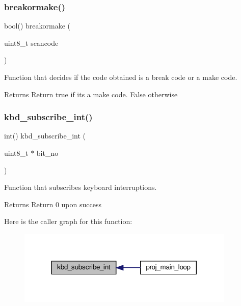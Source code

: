 \subsubsection{\texorpdfstring{breakormake()}{breakormake()}}
{\footnotesize\ttfamily bool() breakormake (\begin{DoxyParamCaption}\item[{uint8\+\_\+t}]{scancode }\end{DoxyParamCaption})}



Function that decides if the code obtained is a break code or a make code. 

\begin{DoxyReturn}{Returns}
Return true if it\textquotesingle{}s a make code. False otherwise 
\end{DoxyReturn}
\mbox{\label{group__keyboard_ga4ac9231a99a664d6a9f0b69767e0d707}} 
\subsubsection{\texorpdfstring{kbd\+\_\+subscribe\+\_\+int()}{kbd\_subscribe\_int()}}
{\footnotesize\ttfamily int() kbd\+\_\+subscribe\+\_\+int (\begin{DoxyParamCaption}\item[{uint8\+\_\+t $\ast$}]{bit\+\_\+no }\end{DoxyParamCaption})}



Function that subscribes keyboard interruptions. 

\begin{DoxyReturn}{Returns}
Return 0 upon success 
\end{DoxyReturn}
Here is the caller graph for this function\+:
\nopagebreak
\begin{figure}[H]
\begin{center}
\leavevmode
\includegraphics[width=293pt]{group__keyboard_ga4ac9231a99a664d6a9f0b69767e0d707_icgraph}
\end{center}
\end{figure}
\mbox{\label{group__keyboard_gaee0a7b54ee426fade9c780418d110fe0}} 
